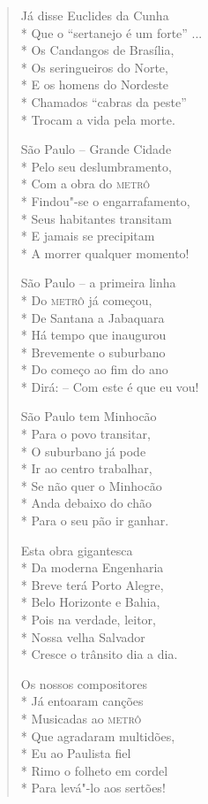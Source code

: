 \begin{verse}
Já disse Euclides da Cunha\\*
Que o ``sertanejo é um forte'' ...\\*
Os Candangos de Brasília,\\*
Os seringueiros do Norte,\\*
E os homens do Nordeste\\*
Chamados ``cabras da peste''\\*
Trocam a vida pela morte.

São Paulo --  Grande Cidade\\*
Pelo seu deslumbramento,\\*
Com a obra do \textsc{metrô}\\*
Findou"-se o engarrafamento,\\*
Seus habitantes transitam\\*
E jamais se precipitam\\*
A morrer qualquer momento!

São Paulo --  a primeira linha\\*
Do \textsc{metrô} já começou,\\*
De Santana a Jabaquara\\*
Há tempo que inaugurou\\*
Brevemente o suburbano\\*
Do começo ao fim do ano\\*
Dirá: --  Com este é que eu vou!

São Paulo tem Minhocão\\*
Para o povo transitar,\\*
O suburbano já pode\\*
Ir ao centro trabalhar,\\*
Se não quer o Minhocão\\*
Anda debaixo do chão\\*
Para o seu pão ir ganhar.

Esta obra gigantesca\\*
Da moderna Engenharia\\*
Breve terá Porto Alegre,\\*
Belo Horizonte e Bahia,\\*
Pois na verdade, leitor,\\*
Nossa velha Salvador\\*
Cresce o trânsito dia a dia.

Os nossos compositores\\*
Já entoaram canções\\*
Musicadas ao \textsc{metrô}\\*
Que agradaram multidões,\\*
Eu ao Paulista fiel\\*
Rimo o folheto em cordel\\*
Para levá"-lo aos sertões!


\end{verse}
